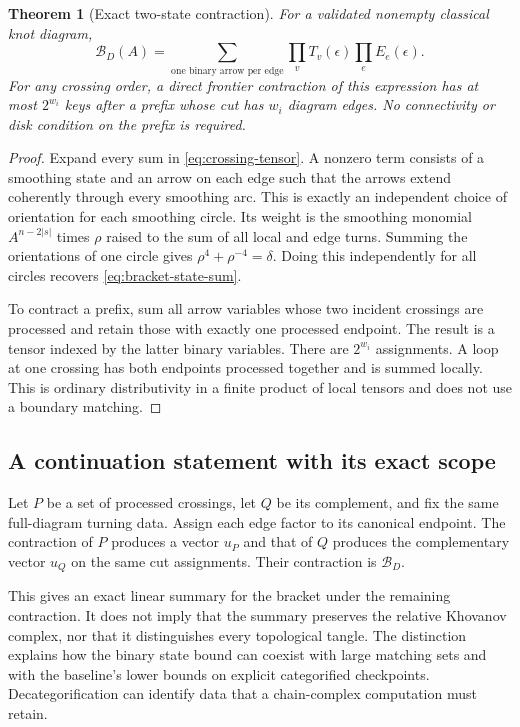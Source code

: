 \documentclass[11pt]{article}
\newtheorem{theorem}{Theorem}[section]
\theoremstyle{definition}
\theoremstyle{remark}
\begin{document}
\begin{theorem}[Exact two-state contraction]
\label{thm:binary-tensor}
For a validated nonempty classical knot diagram,
\begin{equation}\label{eq:network}
 \mathcal B_D(A)=
 \sum_{\text{one binary arrow per edge}}
     \prod_v T_v(\epsilon)\prod_e E_e(\epsilon).
\end{equation}
For any crossing order, a direct frontier contraction of this expression
has at most $2^{w_i}$ keys after a prefix whose cut has $w_i$ diagram edges.
No connectivity or disk condition on the prefix is required.
\end{theorem}

\begin{proof}
Expand every sum in \eqref{eq:crossing-tensor}. A nonzero term consists of
a smoothing state and an arrow on each edge such that the arrows extend
coherently through every smoothing arc. This is exactly an independent
choice of orientation for each smoothing circle. Its weight is the
smoothing monomial $A^{n-2|s|}$ times $\rho$ raised to the sum of all local
and edge turns. Summing the orientations of one circle gives
$\rho^4+\rho^{-4}=\delta$. Doing this independently for all circles recovers
\eqref{eq:bracket-state-sum}.

To contract a prefix, sum all arrow variables whose two incident crossings
are processed and retain those with exactly one processed endpoint. The
result is a tensor indexed by the latter binary variables. There are
$2^{w_i}$ assignments. A loop at one crossing has both endpoints processed
together and is summed locally. This is ordinary distributivity in a
finite product of local tensors and does not use a boundary matching.
\end{proof}

\subsection{A continuation statement with its exact scope}

Let $P$ be a set of processed crossings, let $Q$ be its complement, and
fix the same full-diagram turning data. Assign each edge factor to its
canonical endpoint. The contraction of $P$ produces a vector $u_P$ and
that of $Q$ produces the complementary vector $u_Q$ on the same cut
assignments. Their contraction is $\mathcal B_D$.

This gives an exact linear summary for the bracket under the remaining
contraction. It does not imply that the summary preserves the relative
Khovanov complex, nor that it distinguishes every topological tangle.
The distinction explains how the binary state bound can coexist with
large matching sets and with the baseline's lower bounds on explicit
categorified checkpoints. Decategorification can identify data that a
chain-complex computation must retain.
\end{document}
